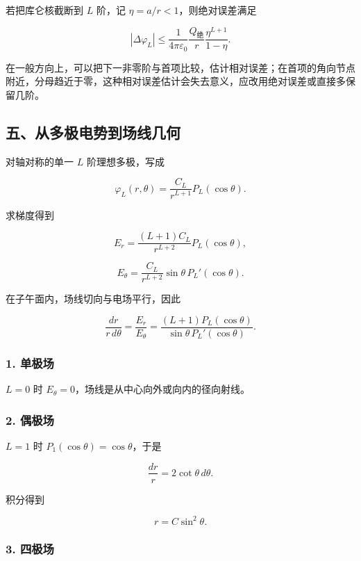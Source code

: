 若把库仑核截断到 \(L\) 阶，记 \(\eta=a/r<1\)，则绝对误差满足

\[
\boxed{
|\Delta\varphi_L|
\le
\frac{1}{4\pi\varepsilon_0}
\frac{Q_{\mathrm{\text{绝}}}}{r}
\frac{\eta^{L+1}}{1-\eta}
}.
\]

在一般方向上，可以把下一非零阶与首项比较，估计相对误差；在首项的角向节点附近，分母趋近于零，这种相对误差估计会失去意义，应改用绝对误差或直接多保留几阶。

\subsection{五、从多极电势到场线几何}\label{m2:ux4e94ux4eceux591aux6781ux7535ux52bfux5230ux573aux7ebfux51e0ux4f55}

对轴对称的单一 \(L\) 阶理想多极，写成

\[
\varphi_L(r,\theta)
=\frac{C_L}{r^{L+1}}P_L(\cos\theta).
\]

求梯度得到

\[
E_r
=\frac{(L+1)C_L}{r^{L+2}}P_L(\cos\theta),
\]

\[
E_{\theta}
=\frac{C_L}{r^{L+2}}
\sin\theta\,P_L'(\cos\theta).
\]

在子午面内，场线切向与电场平行，因此

\[
\boxed{
\frac{dr}{r\,d\theta}
=\frac{E_r}{E_{\theta}}
=\frac{(L+1)P_L(\cos\theta)}
{\sin\theta\,P_L'(\cos\theta)}
}.
\]

\subsubsection{1. 单极场}\label{m2:ux5355ux6781ux573a}

\(L=0\) 时 \(E_{\theta}=0\)，场线是从中心向外或向内的径向射线。

\subsubsection{2. 偶极场}\label{m2:ux5076ux6781ux573a}

\(L=1\) 时 \(P_1(\cos\theta)=\cos\theta\)，于是

\[
\frac{dr}{r}=2\cot\theta\,d\theta.
\]

积分得到

\[
\boxed{r=C\sin^2\theta}.
\]

\subsubsection{3. 四极场}\label{m2:ux56dbux6781ux573a}

